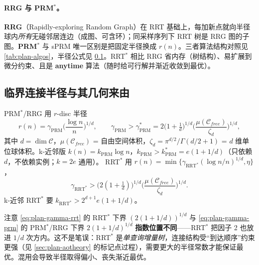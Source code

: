 \paragraph{RRG 与 PRM$^*$。}
\textbf{RRG}（Rapidly-exploring Random Graph）在 RRT 基础上，每加新点就向半径球内\emph{所有}无碰邻居连边（成图、可含环）；同采样序列下 RRT 树是 RRG 图的子图。\textbf{PRM$^*$} 与 sPRM 唯一区别是把固定半径换成 $r(n)$。三者算法结构对照见 \cref{tab:plan-algos}，半径公式见 \cref{sec:plan-radius}。RRT$^*$ 相比 RRG 省内存（树结构）、易扩展到微分约束、且是 \textbf{anytime} 算法（随时给可行解并渐近收敛到最优）。

\subsection{临界连接半径与其几何来由}
\label{sec:plan-radius}

\begin{definition}[渐近最优的连接半径]\label{def:plan-radius}
PRM$^*$/RRG 用 $r$-disc 半径
\begin{equation}
  r(n)=\gamma_{\mathrm{PRM}}\Big(\frac{\log n}{n}\Big)^{1/d},\qquad
  \gamma_{\mathrm{PRM}}>\gamma_{\mathrm{PRM}}^*=2\Big(1+\tfrac1d\Big)^{1/d}\Big(\frac{\mu(\mathcal{C}_{free})}{\zeta_d}\Big)^{1/d},
  \label{eq:plan-gamma-prm}
\end{equation}
其中 $d=\dim\mathcal{C}$，$\mu(\mathcal{C}_{free})$ = 自由空间体积，$\zeta_d=\pi^{d/2}/\Gamma(d/2+1)$ = $d$ 维单位球体积。k-近邻版 $k(n)=k_{\mathrm{PRM}}\log n$，$k_{\mathrm{PRM}}>k_{\mathrm{PRM}}^*=e(1+1/d)$（只依赖 $d$，不依赖实例；$k=2e$ 通用）。
RRT$^*$ 用 $r(n)=\min\{\gamma_{\mathrm{RRT}^*}(\log n/n)^{1/d},\eta\}$，
\begin{equation}
  \gamma_{\mathrm{RRT}^*}>\big(2(1+\tfrac1d)\big)^{1/d}\Big(\frac{\mu(\mathcal{C}_{free})}{\zeta_d}\Big)^{1/d}.
  \label{eq:plan-gamma-rrt}
\end{equation}
k-近邻 RRT$^*$ 要 $k_{\mathrm{RRT}^*}>2^{d+1}e(1+1/d)$。
\end{definition}

\begin{pitfall}
注意 \cref{eq:plan-gamma-rrt} 的 RRT$^*$ 下界 $(2(1+1/d))^{1/d}$ 与 \cref{eq:plan-gamma-prm} 的 PRM$^*$/RRG 下界 $2(1+1/d)^{1/d}$ \textbf{指数位置不同}——RRT$^*$ 把因子 2 也放进 $1/d$ 次方内。这不是笔误：RRT$^*$ 是\emph{单查询增量树}，连接结构受“到达顺序”约束更强（见 \cref{sec:plan-aotheory} 的标记点过程），需要更大的半径常数才能保证最优。混用会导致半径取得偏小、丧失渐近最优。
\end{pitfall}

